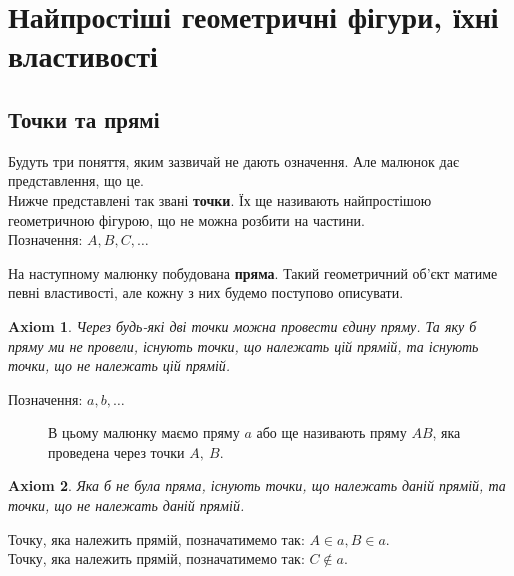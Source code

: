 \documentclass[a4paper, 10pt]{article}
\theoremstyle{theoremdd}
\theoremstyle{theoremdd}
\newtheorem{axiom}{Axiom}
\theoremstyle{theoremdd}
\theoremstyle{theoremdd}
\theoremstyle{theoremdd}
\theoremstyle{theoremdd}
\theoremstyle{theoremdd}
\theoremstyle{theoremdd}
\theoremstyle{theoremdd}
\begin{document}
\tableofcontents
\newpage

\iffalse
\section{Найпростіші геометричні фігури, їхні властивості}
\subsection{Точки та прямі}
Будуть три поняття, яким зазвичай не дають означення. Але малюнок дає представлення, що це.\\
Нижче представлені так звані \textbf{точки}. Їх ще називають найпростішою геометричною фігурою, що не можна розбити на частини.\\
Позначення: $A,B,C,\dots$
\begin{figure}[H]
\centering
{}
\end{figure}

На наступному малюнку побудована \textbf{пряма}. Такий геометричний об'єкт матиме певні властивості, але кожну з них будемо поступово описувати.
\begin{axiom}
Через будь-які дві точки можна провести єдину пряму. Та яку б пряму ми не провели, існують точки, що належать цій прямій, та існують точки, що не належать цій прямій.
\end{axiom}
Позначення: $a,b,\dots$
\begin{figure}[H]
\centering
{}
\caption*{В цьому малюнку маємо пряму $a$ або ще називають пряму $AB$, яка проведена через точки $A,\ B$.}
\end{figure}

\begin{axiom}
Яка б не була пряма, існують точки, що належать даній прямій, та точки, що не належать даній прямій.
\end{axiom}

Точку, яка належить прямій, позначатимемо так: $A \in a, B \in a$. \\
Точку, яка належить прямій, позначатимемо так: $C \notin a$.
\end{document}
